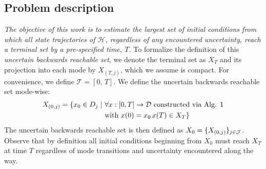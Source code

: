 \subsection{Problem description}
{\em The objective of this work is to estimate the largest set of initial conditions from which all state trajectories of $\mathcal H$, regardless of any encountered uncertainty, reach a terminal set by a pre-specified time, $T$.}
To formalize the definition of this \emph{uncertain backwards reachable set}, we denote the terminal set as $X_T$ and its projection into each mode by $X_{(T,j)}$, which we assume is compact.
For convenience, we define $\mathcal T=[0,\,T]$.
We define the uncertain backwards reachable set mode-wise:
\begin{align}
\begin{aligned}
     X_{(0,j)}=\{x_0\in D_j \mid\ &\forall x: [0,T] \to {\cal D} \text{ constructed via Alg. 1} \\\ & \text{with } x(0) = x_0 \, x(T) \in X_T \}
     \label{eq:brs}
\end{aligned}
\end{align}
The uncertain backwards reachable set is then defined as $X_0 = \{X_{(0,j)} \}_{j\in {\cal J}}$. 
Observe that by definition all initial conditions beginning from $X_0$ must reach $X_T$ at time $T$ regardless of mode transitions and uncertainty encountered along the way.
